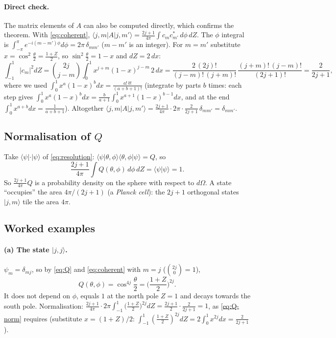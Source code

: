 \documentclass[11pt,a4paper]{article}
\begin{document}
\paragraph{Direct check.} The matrix elements of $A$ can also be computed directly, which confirms the theorem. With
\eqref{eq:coherent}, $\langle j,m|A|j,m'\rangle = \frac{2j+1}{4\pi}\int c_m c_{m'}^*\,d\phi\,dZ$. The $\phi$ integral
is $\int_{-\pi}^{\pi}e^{-i(m-m')\phi}d\phi = 2\pi\,\delta_{mm'}$ ($m-m'$ is an integer). For $m = m'$ substitute $x =
\cos^2\frac\theta2 = \frac{1+Z}{2}$, so $\sin^2\frac\theta2 = 1-x$ and $dZ = 2\,dx$:
\begin{equation*}
  \int_{-1}^{1}|c_m|^2dZ = \binom{2j}{j-m}\!\int_0^1\! x^{j+m}(1-x)^{j-m}\,2\,dx
  = \frac{2\,(2j)!}{(j-m)!\,(j+m)!}\,\frac{(j+m)!\,(j-m)!}{(2j+1)!} = \frac{2}{2j+1},
\end{equation*}
where we used $\int_0^1x^a(1-x)^bdx = \frac{a!\,b!}{(a+b+1)!}$ (integrate by parts $b$ times: each step gives
$\int_0^1x^a(1-x)^b dx = \frac{b}{a+1}\int_0^1x^{a+1}(1-x)^{b-1}dx$, and at the end $\int_0^1x^{a+b}dx =
\frac{1}{a+b+1}$). Altogether $\langle j,m|A|j,m'\rangle = \frac{2j+1}{4\pi}\cdot2\pi\cdot\frac{2}{2j+1}\,\delta_{mm'} =
\delta_{mm'}$.

\subsection{Normalisation of \texorpdfstring{$Q$}{Q}}

Take $\langle\psi|\cdot|\psi\rangle$ of \eqref{eq:resolution}: $\langle\psi|\theta,\phi\rangle\langle\theta,\phi|\psi
\rangle = Q$, so
\begin{equation}\label{eq:Q-norm}
  \boxed{\frac{2j+1}{4\pi}\int Q(\theta,\phi)\,d\phi\,dZ = \langle\psi|\psi\rangle = 1 .}
\end{equation}
So $\frac{2j+1}{4\pi}Q$ is a probability density on the sphere with respect to $d\Omega$. A state ``occupies'' the
area $4\pi/(2j+1)$ (a \emph{Planck cell}): the $2j+1$ orthogonal states $|j,m\rangle$ tile the area $4\pi$.

\subsection{Worked examples}\label{sec:examples}

\paragraph{(a) The state $|j,j\rangle$.} $\psi_m = \delta_{mj}$, so by \eqref{eq:Q} and \eqref{eq:coherent} with $m =
j$ ($\binom{2j}{0} = 1$),
\begin{equation}\label{eq:Q-jj}
  Q(\theta,\phi) = \cos^{4j}\frac\theta2 = \Big(\frac{1+Z}{2}\Big)^{2j} .
\end{equation}
It does not depend on $\phi$, equals $1$ at the north pole $Z = 1$ and decays towards the south pole. Normalisation:
$\frac{2j+1}{4\pi}\cdot2\pi\int_{-1}^{1}\big(\frac{1+Z}{2}\big)^{2j}dZ = \frac{2j+1}{2}\cdot\frac{2}{2j+1} = 1$, as
\eqref{eq:Q-norm} requires (substitute $x = (1+Z)/2$: $\int_{-1}^{1}(\frac{1+Z}{2})^{2j}dZ = 2\int_0^1x^{2j}dx =
\frac{2}{2j+1}$).
\end{document}
